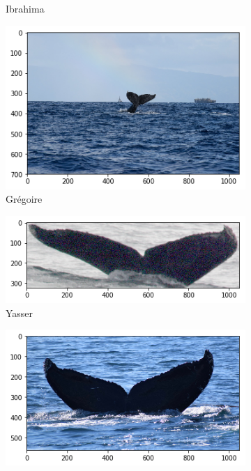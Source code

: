 \begin{frame}[c]
\begin{figure}
\begin{subfigure}[b]{0.24\linewidth}
            \caption{Ibrahima}
        \end{subfigure}
        \begin{subfigure}[b]{0.24\linewidth}
            \centering
            \includegraphics[width=\linewidth]{Whales/new_whale6.png}
            \caption{Grégoire}
        \end{subfigure}
        \begin{subfigure}[b]{0.24\linewidth}
            \centering
            \includegraphics[width=\linewidth]{Whales/w_84308d6.png}
            \caption{Yasser}
        \end{subfigure}
        \begin{subfigure}[b]{0.24\linewidth}
            \centering
            \includegraphics[width=\linewidth]{Whales/w_e1ffbe2.png}

\end{subfigure}
\end{figure}
\end{frame}
